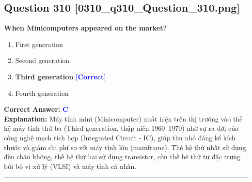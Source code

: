 \documentclass[11pt,a4paper]{article}
\begin{document}
\begin{minipage}{\textwidth}
\subsection*{Question 310 \quad \footnotesize{[0310\_q310\_Question\_310.png]}}
\noindent \textbf{When Minicomputers appeared on the market?}

\begin{enumerate}[label=\Alph*.]
    \item First generation
    \item Second generation
    \item \textbf{Third generation} \hfill \textcolor{blue}{\textbf{[Correct]}}
    \item Fourth generation
\end{enumerate}

\noindent \textbf{Correct Answer:} \textcolor{blue}{\textbf{C}} \\[2pt]
\noindent \textbf{Explanation:} Máy tính mini (Minicomputer) xuất hiện trên thị trường vào thế hệ máy tính thứ ba (Third generation, thập niên 1960–1970) nhờ sự ra đời của công nghệ mạch tích hợp (Integrated Circuit - IC), giúp thu nhỏ đáng kể kích thước và giảm chi phí so với máy tính lớn (mainframe). Thế hệ thứ nhất sử dụng đèn chân không, thế hệ thứ hai sử dụng transistor, còn thế hệ thứ tư đặc trưng bởi bộ vi xử lý (VLSI) và máy tính cá nhân.

\par\vspace{0.3cm}
\hrule
\vspace{0.3cm}
\end{minipage}
\end{document}
